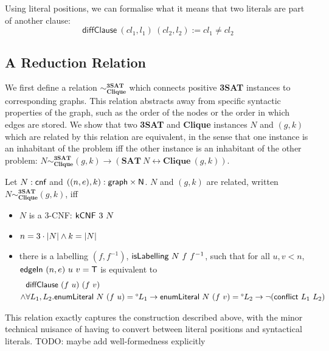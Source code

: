 \documentclass[a4paper,UKenglish,cleveref, autoref]{lipics-v2019}
\begin{document}
Using literal positions, we can formalise what it means that two literals are part of another clause:
\[\textsf{diffClause}~(cl_1, l_1)~(cl_2, l_2) := cl_1 \neq cl_2 \]

\subsection{A Reduction Relation}
\newcommand*{\redrel}{\sim^{\textbf{3SAT}}_{\textbf{Clique}}}
We first define a relation $\redrel$ which connects positive \textbf{3SAT} instances to corresponding graphs. This relation abstracts away from specific syntactic properties of the graph, such as the order of the nodes or the order in which edges are stored. We show that two \textbf{3SAT} and \textbf{Clique} instances $N$ and $(g,k)$ which are related by this relation are equivalent, in the sense that one instance is an inhabitant of the problem iff the other instance is an inhabitant of the other problem: $N \redrel (g, k) \rightarrow (\textbf{SAT}~N \leftrightarrow \textbf{Clique}~(g, k))$.

\begin{definition}
  Let $N : \textsf{cnf}$ and $((n, e), k) : \textsf{graph} \times \mathsf{N}$. $N$ and $(g, k)$ are related, written $N \sim^{\textbf{3SAT}}_{\textbf{Clique}} (g, k)$, iff 
  \begin{itemize} 
    \item $N$ is a 3-CNF: $\normalfont\textsf{kCNF}~3~N$
    \item $n = 3 \cdot |N| \land k = |N|$
    \item there is a labelling $(f, f^{-1})$, $\normalfont\textsf{isLabelling}~N~f~f^{-1}$, such that for all $u, v < n$, $\normalfont\textsf{edgeIn}~(n, e)~u~v = \mathsf{T}$ is equivalent to
      \begin{align*}
        &\normalfont\textsf{diffClause}~(f~u)~(f~v) \\
      \land& \forall L_1,L_2. \normalfont{\textsf{enumLiteral}}~N~(f~u) = \degree L_1 \rightarrow \normalfont{\textsf{enumLiteral}}~N~(f~v) = \degree L_2 \rightarrow \lnot (\normalfont\textsf{conflict}~L_1~L_2) 
    \end{align*}
  \end{itemize}
\end{definition}

This relation exactly captures the construction described above, with the minor technical nuisance of having to convert between literal positions and syntactical literals.
TODO: maybe add well-formedness explicitly
\end{document}
